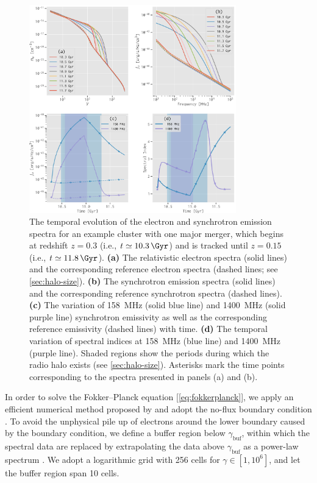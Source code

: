 \documentclass[twocolumn]{aastex62}
\newcommand{\R}[1]{\mathrm{#1}}
\begin{document}
\begin{figure}
  \centering
  \includegraphics[width=0.8\textwidth]{spec-evo-example}
  \caption{\label{fig:spec-evo}%
    The temporal evolution of the electron and synchrotron
    emission spectra for an example cluster with one major merger,
    which begins at redshift $z = 0.3$ (i.e., $t \simeq \SI{10.3}{\Gyr}$)
    and is tracked until $z = 0.15$ (i.e., $t \simeq \SI{11.8}{\Gyr}$).
    \textbf{(a)} The relativistic electron spectra (solid lines) and the
    corresponding reference electron spectra (dashed lines; see
    \autoref{sec:halo-size}).
    \textbf{(b)} The synchrotron emission spectra (solid lines) and the
    corresponding reference synchrotron spectra (dashed lines).
    \textbf{(c)} The variation of \SI{158}{\MHz} (solid blue line) and
    \SI{1400}{\MHz} (solid purple line) synchrotron emissivity as well as
    the corresponding reference emissivity (dashed lines) with time.
    \textbf{(d)} The temporal variation of spectral indices at
    \SI{158}{\MHz} (blue line) and \SI{1400}{\MHz} (purple line).
    Shaded regions show the periods during which the radio halo exists
    (see \autoref{sec:halo-size}).
    Asterisks mark the time points corresponding to the spectra presented
    in panels (a) and (b).
  }
\end{figure}

In order to solve the Fokker--Planck equation [\autoref{eq:fokkerplanck}],
we apply an efficient numerical method proposed by \citet{chang1970}
and adopt the no-flux boundary condition \citep{park1996}.
To avoid the unphysical pile up of electrons around the lower boundary
caused by the boundary condition,
we define a buffer region below $\gamma_{\R{buf}}$, within which
the spectral data are replaced by extrapolating the data above
$\gamma_{\R{buf}}$ as a power-law spectrum \citep{donnert2014}.
We adopt a logarithmic grid with 256 cells for $\gamma \in [1, 10^6]$,
and let the buffer region span 10 cells.
\end{document}
